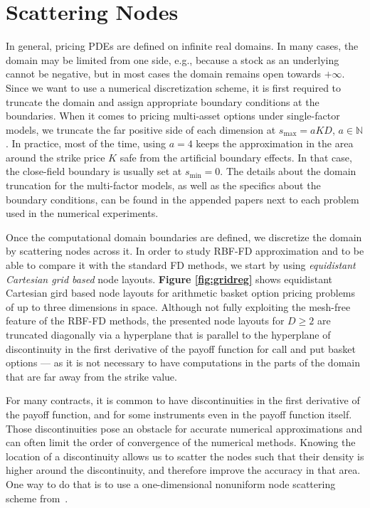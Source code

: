 \documentclass{UUThesisTemplate}
\begin{document}
\section{Scattering Nodes}
In general, pricing PDEs are defined on infinite real domains. In many cases, the domain may be limited from one side, e.g., because a stock as an underlying cannot be negative, but in most cases the domain remains open towards $+\infty$. Since we want to use a numerical discretization scheme, it is first required to truncate the domain and assign appropriate boundary conditions at the boundaries. When it comes to pricing multi-asset options under single-factor models, we truncate the far positive side of each dimension at $s_{\max}=aKD$, $a\in\mathbb{N}$. In practice, most of the time, using $a=4$ keeps the approximation in the area around the strike price $K$ safe from the artificial boundary effects. In that case, the close-field boundary is usually set at $s_{\min}=0$. The details about the domain truncation for the multi-factor models, as well as the specifics about the boundary conditions, can be found in the appended papers next to each problem used in the numerical experiments.
\par Once the computational domain boundaries are defined, we discretize the domain by scattering nodes across it. In order to study RBF-FD approximation and to be able to compare it with the standard FD methods, we start by using \emph{equidistant Cartesian grid based} node layouts. \textbf{Figure \ref{fig:gridreg}} shows equidistant Cartesian gird based node layouts for arithmetic basket option pricing problems of up to three dimensions in space. Although not fully exploiting the mesh-free feature of the RBF-FD methods, the presented node layouts for $D\geq2$ are truncated diagonally via a hyperplane that is parallel to the hyperplane of discontinuity in the first derivative of the payoff function for call and put basket options --- as it is not necessary to have computations in the parts of the domain that are far away from the strike value.  
\par
For many contracts, it is common to have discontinuities in the first derivative of the payoff function, and for some instruments even in the payoff function itself. Those discontinuities pose an obstacle for accurate numerical approximations and can often limit the order of convergence of the numerical methods. Knowing the location of a discontinuity allows us to scatter the nodes such that their density is higher around the discontinuity, and therefore improve the accuracy in that area. One way to do that is to use a one-dimensional nonuniform node scattering scheme from~\cite{foulon2010adi}.
\end{document}
